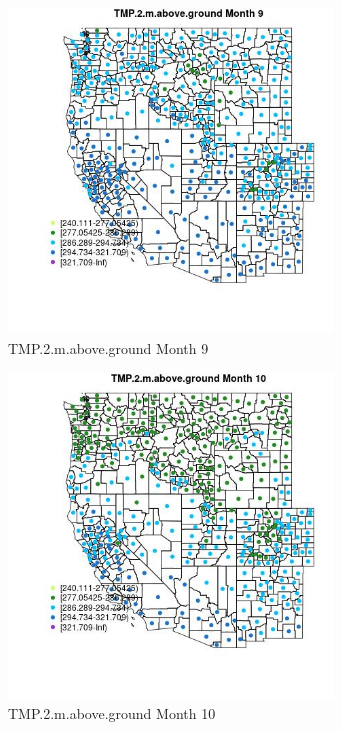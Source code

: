 \begin{figure} 
\centering  
\includegraphics[width=0.77\textwidth]{Code_Outputs/df_report_ML_predictors_CountyCentroid_Locations_Dates_2008-01-01to2018-12-31_MapObsMo9TMP2maboveground.jpg} 
\caption{\label{fig:df_report_ML_predictors_CountyCentroid_Locations_Dates_2008-01-01to2018-12-31MapObsMo9TMP2maboveground}TMP.2.m.above.ground Month 9} 
\end{figure} 
 

\begin{figure} 
\centering  
\includegraphics[width=0.77\textwidth]{Code_Outputs/df_report_ML_predictors_CountyCentroid_Locations_Dates_2008-01-01to2018-12-31_MapObsMo10TMP2maboveground.jpg} 
\caption{\label{fig:df_report_ML_predictors_CountyCentroid_Locations_Dates_2008-01-01to2018-12-31MapObsMo10TMP2maboveground}TMP.2.m.above.ground Month 10} 
\end{figure} 
 

